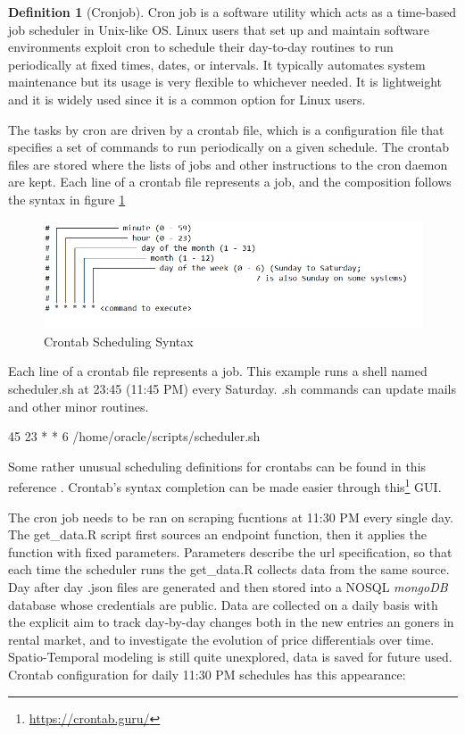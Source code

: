 \documentclass[
  12pt,
  a4paper,
  oneside]{book}
\DeclareRobustCommand{\href}[2]{#2\footnote{\url{#1}}}
\theoremstyle{definition}
\newtheorem{definition}{Definition}[chapter]
\theoremstyle{definition}
\theoremstyle{definition}
\theoremstyle{remark}
\begin{document}
\begin{definition}[Cronjob]
\protect\hypertarget{def:cronjob}{}{\label{def:cronjob} {} }Cron job is a software utility which acts as a time-based job scheduler in Unix-like OS. Linux users that set up and maintain software environments exploit cron to schedule their day-to-day routines to run periodically at fixed times, dates, or intervals. It typically automates system maintenance but its usage is very flexible to whichever needed. It is lightweight and it is widely used since it is a common option for Linux users.
\end{definition}
The tasks by cron are driven by a crontab file, which is a configuration file that specifies a set of commands to run periodically on a given schedule. The crontab files are stored where the lists of jobs and other instructions to the cron daemon are kept.
Each line of a crontab file represents a job, and the composition follows the syntax in figure \ref{fig:crontab}

\begin{figure}
\centering
\includegraphics{images/crontab.PNG}
\caption{\label{fig:crontab}Crontab Scheduling Syntax}
\end{figure}

Each line of a crontab file represents a job. This example runs a shell named scheduler.sh at 23:45 (11:45 PM) every Saturday. .sh commands can update mails and other minor routines.

45 23 * * 6 /home/oracle/scripts/scheduler.sh

Some rather unusual scheduling definitions for crontabs can be found in this reference \citep{wiki:cronjob}. Crontab's syntax completion can be made easier through \href{https://crontab.guru/}{this} GUI.

The cron job needs to be ran on scraping fucntions at 11:30 PM every single day. The get\_data.R script first sources an endpoint function, then it applies the function with fixed parameters. Parameters describe the url specification, so that each time the scheduler runs the get\_data.R collects data from the same source. Day after day .json files are generated and then stored into a NOSQL \emph{mongoDB} database whose credentials are public. Data are collected on a daily basis with the explicit aim to track day-by-day changes both in the new entries an goners in rental market, and to investigate the evolution of price differentials over time. Spatio-Temporal modeling is still quite unexplored, data is saved for future used. Crontab configuration for daily 11:30 PM schedules has this appearance:
\end{document}
